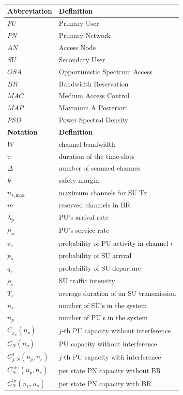 \begin{table}
\begin{tabular}{ll} \hline
\textbf{Abbreviation} & \textbf{Definition}\\\hline
$PU$ & Primary User\\
$PN$ & Primary Network\\
$AN$ & Access Node\\
$SU$ & Secondary User\\
$OSA$ & Opportunistic Spectrum Access\\
$BR$ & Bandwidth Reservation\\
$MAC$ & Medium Access Control\\
$MAP$ & Maximum A Posteriori\\
$PSD$ & Power Spectral Density\\\hline
\textbf{Notation} & \textbf{Definition}\\\hline
$W$ & channel bandwidth\\
$\tau$ & duration of the time-slots\\
$\Delta$ & number of scanned channes\\
$k$ & safety margin\\
$n_{s,\text{max}}$ & maximum channels for SU Tx\\
$m$ & reserved channels in BR\\
$\lambda_{p}$ & PU's arrival rate\\
$\mu_{p}$ & PU's service rate\\
$\pi_{i}$ & probability of PU activity in channel $i$\\
$p_{s}$ & probability of SU arrival\\
$q_{s}$ & probability of SU departure\\
$\rho_{s}$ & SU traffic intensity\\
$T_{s}$ & average duration of an SU transmission\\
$n_{s}$	& number of SU's in the system\\
$n_{p}$	& number of PU's in the system\\
$C_{j_N}\left(n_{p}\right)$ & $j$-th PU capacity without interference\\
${C}_{N}\left(n_{p}\right)$ & PU capacity without interference\\
$C^{I}_{j,N}\left(n_{p},n_{s}\right)$ & $j$-th PU capacity with interference\\
$C^{\text{nbr}}_{N}\left(n_{p},n_{s}\right)$ & per state PN capacity without BR\\
$C^{\text{br}}_{N}\left(n_{p},n_{s}\right)$ & per state PN capacity with BR\\

\end{tabular}
\end{table}
